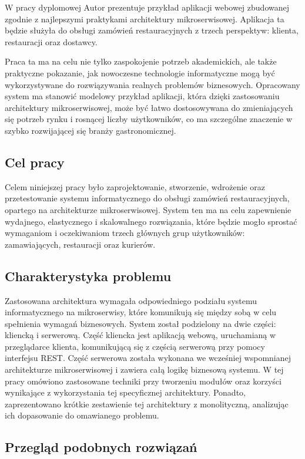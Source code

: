 W pracy dyplomowej Autor prezentuje przykład aplikacji webowej zbudowanej zgodnie z najlepszymi praktykami architektury mikroserwisowej. Aplikacja ta będzie służyła do obsługi zamówień restauracyjnych z trzech perspektyw: klienta, restauracji oraz dostawcy.

Praca ta ma na celu nie tylko zaspokojenie potrzeb akademickich, ale także praktyczne pokazanie, jak nowoczesne technologie informatyczne mogą być wykorzystywane do rozwiązywania realnych problemów biznesowych. Opracowany system ma stanowić modelowy przykład aplikacji, która dzięki zastosowaniu architektury mikroserwisowej, może być łatwo dostosowywana do zmieniających się potrzeb rynku i rosnącej liczby użytkowników, co ma szczególne znaczenie w szybko rozwijającej się branży gastronomicznej.

\subsection{Cel pracy}

Celem niniejszej pracy było zaprojektowanie, stworzenie, wdrożenie oraz przetestowanie systemu informatycznego do obsługi zamówień restauracyjnych, opartego na architekturze mikroserwisowej. System ten ma na celu zapewnienie wydajnego, elastycznego i skalowalnego rozwiązania, które będzie mogło sprostać wymaganiom i oczekiwaniom trzech głównych grup użytkowników: zamawiających, restauracji oraz kurierów.

\subsection{Charakterystyka problemu}

Zastosowana architektura wymagała odpowiedniego podziału systemu informatycznego na mikroserwisy, które komunikują się między sobą w celu spełnienia wymagań biznesowych. System został podzielony na dwie części: kliencką i serwerową. Część kliencka jest aplikacją webową, uruchamianą w przeglądarce klienta, komunikującą się z częścią serwerową przy pomocy interfejsu REST. Część serwerowa została wykonana we wcześniej wspomnianej architekturze mikroserwisowej i zawiera całą logikę biznesową systemu. W tej pracy omówiono zastosowane techniki przy tworzeniu modułów oraz korzyści wynikające z wykorzystania tej specyficznej architektury. Ponadto, zaprezentowano krótkie zestawienie tej architektury z monolityczną, analizując ich dopasowanie do omawianego problemu.

\subsection{Przegląd podobnych rozwiązań}

